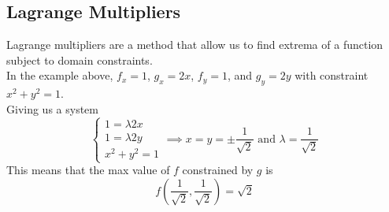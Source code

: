 \subsection{Lagrange Multipliers}
\noindent
Lagrange multipliers are a method that allow us to find extrema of a function subject to domain constraints.\\



\noindent
In the example above, $f_x = 1$, $g_x = 2x$, $f_y = 1$, and $g_y = 2y$ with constraint $x^2 + y^2 = 1$.\\ 
Giving us a system
\begin{equation*}
	\begin{cases}
		1 = \lambda 2x \\ 
		1 = \lambda 2y \\ 
		x^2 + y^2 = 1
	\end{cases} \implies x = y = \pm \frac{1}{\sqrt{2}}\text{ and } \lambda = \frac{1}{\sqrt{2}}
\end{equation*}
This means that the max value of $f$ constrained by $g$ is
\begin{equation*}
	f\left(\frac{1}{\sqrt{2}},\frac{1}{\sqrt{2}}\right) = \sqrt{2}
\end{equation*}

